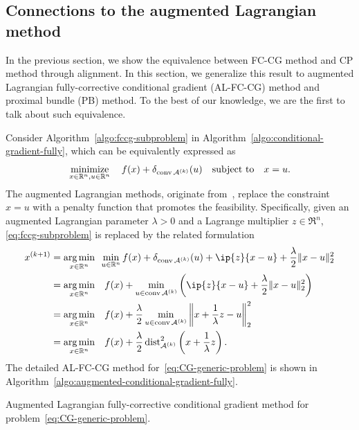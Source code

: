 \subsection{Connections to the augmented Lagrangian method}

In the previous section, we show the equivalence between FC-CG method and CP method through alignment. In this section, we generalize this result to augmented Lagrangian fully-corrective conditional gradient (AL-FC-CG) method and proximal bundle (PB) method. To the best of our knowledge, we are the first to talk about such equivalence.

Consider Algorithm~\ref{algo:fccg-subproblem} in Algorithm~\ref{algo:conditional-gradient-fully}, which can be equivalently expressed as 
\begin{equation} \label{eq:fccg-subproblem}
  \displaystyle\mathop{\hbox{\rm minimize}}_{x\in\mathbb{R}^n, u\in\mathbb{R}^n}\enspace\enspace f(x) + \delta_{\operatorname{conv}\mathcal{A}^{(k)}}(u) \ \enspace\mathop{\hbox{\rm subject to}}\enspace \ x = u.
\end{equation}
The augmented Lagrangian methods, originate from~\citet{hest:1969}, replace the
constraint $x = u$ with a penalty function that promotes the feasibility.
Specifically, given an augmented Lagrangian parameter $\lambda>0$ and a Lagrange
multiplier $z\in\Re^n$, \eqref{eq:fccg-subproblem} is replaced by the related formulation
\begin{align}
  x\kp1 &= \argmin{x\in\Re^n} \min_{u\in\Re^n} f(x) + \delta_{\conv\Ascr\k}(u) + \ip{z}{x - u} + \frac{\lambda}{2}\|x - u\|_2^2\nonumber
  \\&= \argmin{x\in\Re^n}\enspace f(x) + \min_{u \in \conv\Ascr\k} \bigg(\ip{z}{x - u} + \frac{\lambda}{2}\|x - u\|_2^2\bigg)\nonumber
  \\&= \argmin{x\in\Re^n}\enspace f(x) + \frac{\lambda}{2} \min_{u \in \conv\Ascr\k} \left\|x + \frac{1}{\lambda}z - u\right\|_2^2\nonumber 
  \\&= \argmin{x\in\Re^n}\enspace f(x) + \frac{\lambda}{2}\dist_{\Ascr\k}^2\left(x + \frac{1}{\lambda}z\right)\label{eq:augmented-lagrangian}.
\end{align}
The detailed AL-FC-CG method for~\eqref{eq:CG-generic-problem} is shown in Algorithm~\ref{algo:augmented-conditional-gradient-fully}.  

\begin{algorithm}[t]
  \DontPrintSemicolon\setcounter{AlgoLine}{-1}
  \caption{Augmented Lagrangian fully-corrective conditional gradient method
   for problem~\eqref{eq:CG-generic-problem}.}
  \label{algo:augmented-conditional-gradient-fully}
\end{algorithm}

